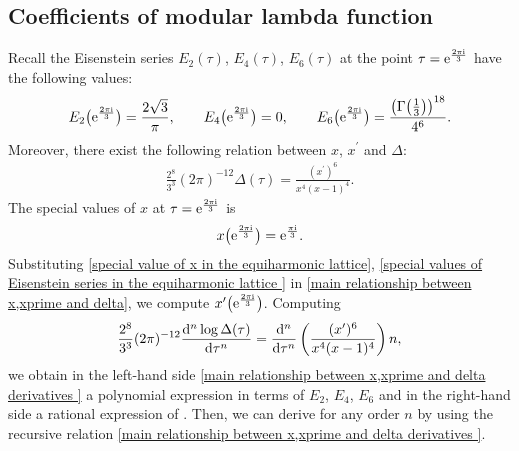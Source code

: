 \subsection{Coefficients of modular lambda function}\label{Coefficients of Modular lambda function}

Recall the Eisenstein series $E_2(\tau)$, $E_4(\tau)$, $E_6(\tau)$ at the point $\tau={\rm e}^{\frac{2\pi {\rm i}}{3}}$ have the following values:
\begin{gather}\label{special values of Eisenstein series in the equiharmonic lattice }
E_2\bigl({\rm e}^{\frac{2\pi {\rm i}}{3}}\bigr)=\frac{2\sqrt{3}}{\pi}, \qquad E_4\bigl({\rm e}^{\frac{2\pi {\rm i}}{3}}\bigr)=0, \qquad E_6\bigl({\rm e}^{\frac{2\pi {\rm i}}{3}}\bigr)=\frac{\bigl(\Gamma\bigl(\frac{1}{3}\bigr)\bigr)^{18}}{4^6}.
\end{gather}
Moreover, there exist the following relation between $x$, $x^{\prime}$ and $\Delta$:
\begin{gather}
\frac{2^8}{3^3}(2\pi )^{-12}\Delta(\tau)=\frac{(x^{\prime})^6}{x^4(x-1)^4}.\label{main relationship between x,xprime and delta}
\end{gather}
The special values of $x$ at $\tau={\rm e}^{\frac{2\pi {\rm i}}{3}}$ is
\begin{gather}
x\bigl({\rm e}^{\frac{2\pi {\rm i}}{3}}\bigr)={\rm e}^{\frac{\pi {\rm i}}{3}}.\label{special value of x in the equiharmonic lattice}
\end{gather}
Substituting \eqref{special value of x in the equiharmonic lattice}, \eqref{special values of Eisenstein series in the equiharmonic lattice } in \eqref{main relationship between x,xprime and delta}, we compute $x^{\prime}\bigl({\rm e}^{\frac{2\pi {\rm i}}{3}}\bigr)$. Computing
\begin{gather}
\frac{2^8}{3^3}(2\pi )^{-12}\frac{{\rm d}^n\log\Delta(\tau)}{{\rm d}\tau^n}=\frac{{\rm d}^n}{{\rm d}\tau^n}\left(\frac{(x^{\prime})^6}{x^4(x-1)^4}\right)n,\label{main relationship between x,xprime and delta derivatives }
\end{gather}
we obtain in the left-hand side \eqref{main relationship between x,xprime and delta derivatives } a polynomial expression in terms of $E_2$, $E_4$, $E_6$ and in the right-hand side a rational expression of . Then, we can derive  for any order $n$ by using the recursive relation \eqref{main relationship between x,xprime and delta derivatives }.
